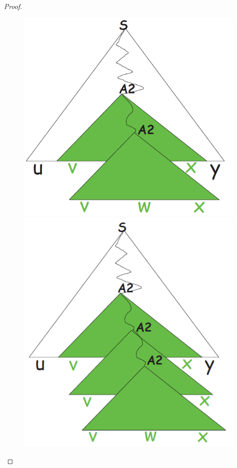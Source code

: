 \documentclass[class=book, crop=false, oneside]{standalone}
\begin{document}
\begin{proof}
  \begin{figure}[H]
    \centering
    \begin{minipage}{0.25\textwidth}
      \centering
      \includegraphics[width=\textwidth,keepaspectratio]{pl-proof_3}
    \end{minipage}
     \hfill
    \begin{minipage}{0.25\textwidth}
      \centering
      \includegraphics[width=\textwidth,keepaspectratio]{pl-proof_4}
    \end{minipage}
  \end{figure}



\end{proof}
\end{document}
